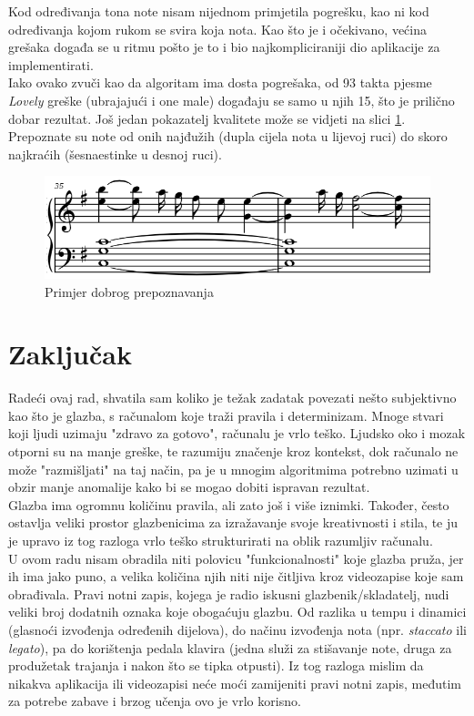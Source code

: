 \documentclass[times, utf8, zavrsni, numeric]{fer}
\begin{document}
Kod određivanja tona note nisam nijednom primjetila pogrešku, kao ni kod određivanja kojom rukom se svira koja nota. Kao što je i očekivano, većina grešaka događa se u ritmu pošto je to i bio najkompliciraniji dio aplikacije za implementirati.\\

Iako ovako zvuči kao da algoritam ima dosta pogrešaka, od 93 takta pjesme \textit{Lovely} greške (ubrajajući i one male) događaju se samo u njih 15, što je prilično dobar rezultat. Još jedan pokazatelj kvalitete može se vidjeti na slici \ref{fig:super}. Prepoznate su note od onih najđužih (dupla cijela nota u lijevoj ruci) do skoro najkraćih (šesnaestinke u desnoj ruci).

\begin{figure}[h]
	\includegraphics[scale=0.75]{super.png}
	\centering
	\caption{Primjer dobrog prepoznavanja}
	\label{fig:super}
\end{figure}

\chapter{Zaključak}
Radeći ovaj rad, shvatila sam koliko je težak zadatak povezati nešto subjektivno kao što je glazba, s računalom koje traži pravila i determinizam. Mnoge stvari koji ljudi uzimaju "zdravo za gotovo", računalu je vrlo teško. Ljudsko oko i mozak otporni su na manje greške, te razumiju značenje kroz kontekst, dok računalo ne može "razmišljati" na taj način, pa je u mnogim algoritmima potrebno uzimati u obzir manje anomalije kako bi se mogao dobiti ispravan rezultat.\\

Glazba ima ogromnu količinu pravila, ali zato još i više iznimki. Također, često ostavlja veliki prostor glazbenicima za izražavanje svoje kreativnosti i stila, te ju je upravo iz tog razloga vrlo teško strukturirati na oblik razumljiv računalu.\\

U ovom radu nisam obradila niti polovicu "funkcionalnosti" koje glazba pruža, jer ih ima jako puno, a velika količina njih niti nije čitljiva kroz videozapise koje sam obrađivala. Pravi notni zapis, kojega je radio iskusni glazbenik/skladatelj, nudi veliki broj dodatnih oznaka koje obogaćuju glazbu. Od razlika u tempu i dinamici (glasnoći izvođenja određenih dijelova), do načinu izvođenja nota (npr. \textit{staccato} ili \textit{legato}), pa do korištenja pedala klavira (jedna služi za stišavanje note, druga za produžetak trajanja i nakon što se tipka otpusti). Iz tog razloga mislim da nikakva aplikacija ili videozapisi neće moći zamijeniti pravi notni zapis, međutim za potrebe zabave i brzog učenja ovo je vrlo korisno.\\
\end{document}
